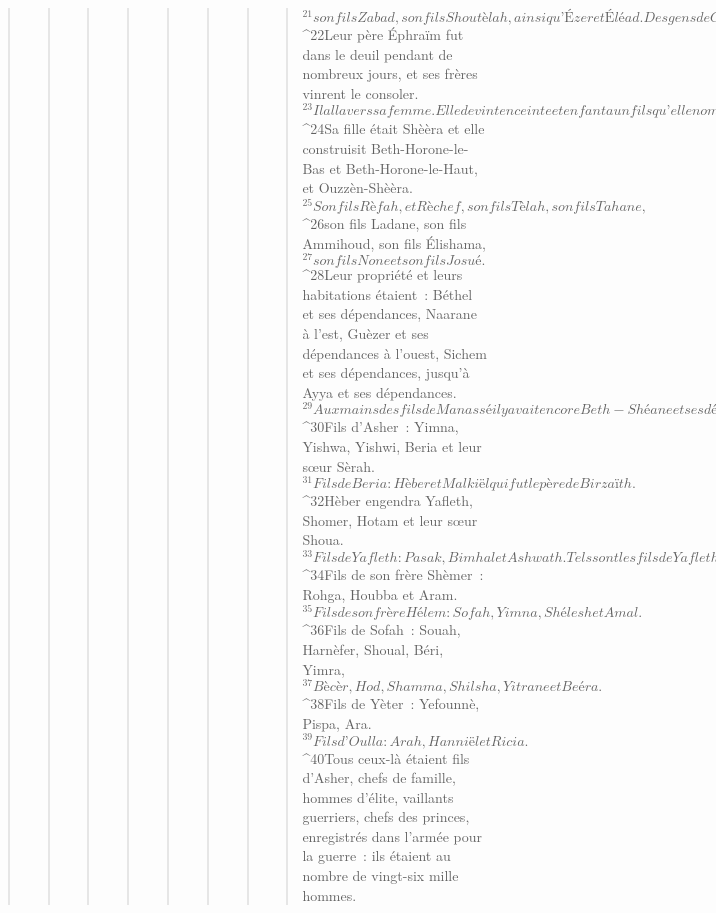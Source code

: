 \begin{verse}
\begin{verse}
\begin{verse}
\begin{verse}
\begin{verse}
\begin{verse}
\begin{verse}
\begin{verse}
${}^{21}son fils Zabad, son fils Shoutèlah, ainsi qu’Ézer et Éléad. Des gens de Gath, natifs du pays, les tuèrent, car ils étaient descendus pour prendre leurs troupeaux. 
${}^{22}Leur père Éphraïm fut dans le deuil pendant de nombreux jours, et ses frères vinrent le consoler. 
${}^{23}Il alla vers sa femme. Elle devint enceinte et enfanta un fils qu’elle nomma Beria (c’est-à-dire : Dans le malheur), car chez lui elle était dans le malheur. 
${}^{24}Sa fille était Shèèra et elle construisit Beth-Horone-le-Bas et Beth-Horone-le-Haut, et Ouzzèn-Shèèra. 
${}^{25}Son fils Rèfah, et Rèchef, son fils Tèlah, son fils Tahane, 
${}^{26}son fils Ladane, son fils Ammihoud, son fils Élishama, 
${}^{27}son fils None et son fils Josué.
${}^{28}Leur propriété et leurs habitations étaient : Béthel et ses dépendances, Naarane à l’est, Guèzer et ses dépendances à l’ouest, Sichem et ses dépendances, jusqu’à Ayya et ses dépendances. 
${}^{29}Aux mains des fils de Manassé il y avait encore Beth-Shéane et ses dépendances, Taanak et ses dépendances, Meguiddo et ses dépendances, Dor et ses dépendances. C’est là qu’habitaient les fils de Joseph, fils d’Israël.
${}^{30}Fils d’Asher : Yimna, Yishwa, Yishwi, Beria et leur sœur Sèrah. 
${}^{31}Fils de Beria : Hèber et Malkiël qui fut le père de Birzaïth. 
${}^{32}Hèber engendra Yafleth, Shomer, Hotam et leur sœur Shoua. 
${}^{33}Fils de Yafleth : Pasak, Bimhal et Ashwath. Tels sont les fils de Yafleth. 
${}^{34}Fils de son frère Shèmer : Rohga, Houbba et Aram. 
${}^{35}Fils de son frère Hélem : Sofah, Yimna, Shélesh et Amal. 
${}^{36}Fils de Sofah : Souah, Harnèfer, Shoual, Béri, Yimra, 
${}^{37}Bècèr, Hod, Shamma, Shilsha, Yitrane et Beéra. 
${}^{38}Fils de Yèter : Yefounnè, Pispa, Ara. 
${}^{39}Fils d’Oulla : Arah, Hanniël et Ricia. 
${}^{40}Tous ceux-là étaient fils d’Asher, chefs de famille, hommes d’élite, vaillants guerriers, chefs des princes, enregistrés dans l’armée pour la guerre : ils étaient au nombre de vingt-six mille hommes.
      

\end{verse}
\end{verse}
\end{verse}
\end{verse}
\end{verse}
\end{verse}
\end{verse}
\end{verse}
